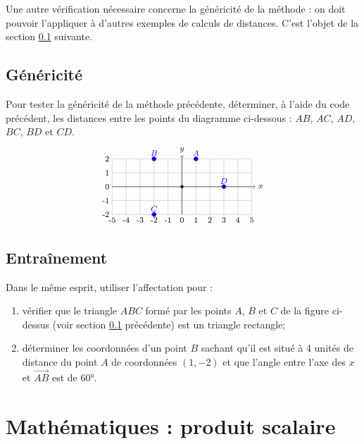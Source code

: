Une autre vérification nécessaire concerne la généricité de la méthode : 
on doit pouvoir l'appliquer à d'autres exemples de calculs de distances.
C'est l'objet de la section \ref{affectation:figures:genericite} suivante.

\subsection{Généricité}\label{affectation:figures:genericite}
Pour tester la généricité de la méthode précédente, déterminer, à l'aide du code \python{} précédent, 
les distances entre les points du diagramme ci-dessous : $AB$, $AC$, $AD$, $BC$, $BD$ et $CD$.
$$
\begin{tikzpicture}[scale=0.5]\footnotesize
\draw[color=lightgray](-5,-2) grid[xstep=1,ystep=1] (5,2);
\foreach \x in {-5,-4,...,5} \draw(\x,-2) node[below]{\x};
\foreach \y in {-2,-1,...,2} \draw(-5,\y) node[left]{\y};
\filldraw(0,0) circle (0.1);
\draw[->] (-5,0) -- (5.25,0);
\draw (5.25,0) node[right]{$x$} ;
\draw[->] (0,-2) -- (0,2.25);
\draw (0,2.25) node[above]{$y$};
\filldraw[color=blue] (1,2) circle (0.15);
\draw (1,2) node[above,color=blue]{${A}$};
\filldraw[color=blue] (-2,2) circle (0.15);
\draw (-2,2) node[above,color=blue]{${B}$};
\filldraw[color=blue] (-2,-2) circle (0.15);
\draw (-2,-2) node[above,color=blue]{${C}$};
\filldraw[color=blue] (3,0) circle (0.15);
\draw (3,0) node[above,color=blue]{${D}$};
\end{tikzpicture}
$$

\subsection{Entraînement}\label{affectation:figures:entrainement}
Dans le même esprit, utiliser l'affectation pour :
\begin{enumerate}
\item vérifier que le triangle $ABC$ formé par les points $A$, $B$ et $C$ de la figure ci-dessus 
	(voir section \ref{affectation:figures:genericite} précédente) est un triangle rectangle;
\item déterminer les coordonnées d'un point $B$ sachant qu'il est situé à 4 unités de distance
	du point $A$ de coordonnées $(1,-2)$ et que l'angle entre l'axe des $x$ et $\vec{AB}$ 
	est de 60°.
\end{enumerate}

\section{Mathématiques : produit scalaire}\label{affectation:maths}

